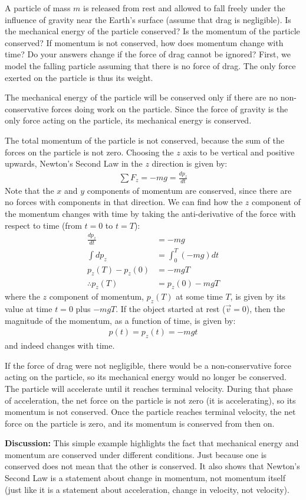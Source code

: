 \begin{example}{A particle of mass $m$ is released from rest and allowed to fall freely under the influence of gravity near the Earth's surface (assume that drag is negligible). Is the mechanical energy of the particle conserved? Is the momentum of the particle conserved? If momentum is not conserved, how does momentum change with time? Do your answers change if the force of drag cannot be ignored?}
First, we model the falling particle assuming that there is no force of drag. The only force exerted on the particle is thus its weight. 

The mechanical energy of the particle will be conserved only if there are no non-conservative forces doing work on the particle. Since the force of gravity is the only force acting on the particle, its mechanical energy is conserved.

The total momentum of the particle is not conserved, because the sum of the forces on the particle is not zero. Choosing the $z$ axis to be vertical and positive upwards, Newton's Second Law in the $z$ direction is given by:
\begin{align*}
\sum F_z = -mg=\frac{dp_z}{dt}
\end{align*}
Note that the $x$ and $y$ components of momentum are conserved, since there are no forces with components in that direction. We can find how the $z$ component of the momentum changes with time by taking the anti-derivative of the force with respect to time (from $t=0$ to $t=T$):
\begin{align*}
\frac{dp_z}{dt} &= -mg\\
\int dp_z &= \int_0^T (-mg) dt\\
p_z(T) - p_z(0) &= -mgT\\
\therefore p_z(T) &= p_z(0) - mgT
\end{align*}
where the $z$ component of momentum, $p_z(T)$ at some time $T$, is given by its value at time $t=0$ plus $-mgT$. If the object started at rest ($\vec v=0$), then the magnitude of the momentum, as a function of time, is given by:
\begin{align*}
p(t) = p_z(t) = -mgt
\end{align*}
and indeed changes with time.

If the force of drag were not negligible, there would be a non-conservative force acting on the particle, so its mechanical energy would no longer be conserved. The particle will accelerate until it reaches terminal velocity. During that phase of acceleration, the net force on the particle is not zero (it is accelerating), so its momentum is not conserved. Once the particle reaches terminal velocity, the net force on the particle is zero, and its momentum is conserved from then on.

\textbf{Discussion:} This simple example highlights the fact that mechanical energy and momentum are conserved under different conditions. Just because one is conserved does not mean that the other is conserved. It also shows that Newton's Second Law is a statement about change in momentum, not momentum itself (just like it is a statement about acceleration, change in velocity, not velocity).
\end{example}

